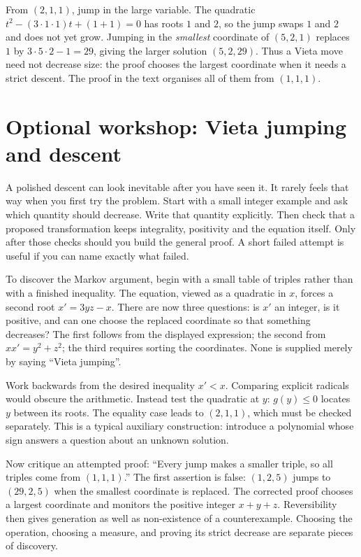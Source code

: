 \begin{examplex}
From $(2,1,1)$, jump in the large variable. The quadratic $t^2-(3\cdot 1\cdot 1)t+(1+1)=0$ has roots $1$ and $2$, so the jump swaps $1$ and $2$ and does not yet grow. Jumping in the \emph{smallest} coordinate of $(5,2,1)$ replaces $1$ by $3\cdot5\cdot2-1=29$, giving the larger solution $(5,2,29)$. Thus a Vieta move need not decrease size: the proof chooses the largest coordinate when it needs a strict descent. The proof in the text organises all of them from $(1,1,1)$.
\end{examplex}

\section{Optional workshop: Vieta jumping and descent}

A polished descent can look inevitable after you have seen it. It rarely feels that way when you first try the problem. Start with a small integer example and ask which quantity should decrease. Write that quantity explicitly. Then check that a proposed transformation keeps integrality, positivity and the equation itself. Only after those checks should you build the general proof. A short failed attempt is useful if you can name exactly what failed.

To discover the Markov argument, begin with a small table of triples rather
than with a finished inequality. The equation, viewed as a quadratic in $x$,
forces a second root $x'=3yz-x$. There are now three questions: is $x'$
an integer, is it positive, and can one choose the replaced coordinate so
that something decreases? The first follows from the displayed expression;
the second from $xx'=y^2+z^2$; the third requires sorting the coordinates.
None is supplied merely by saying ``Vieta jumping''.

Work backwards from the desired inequality $x'<x$. Comparing explicit
radicals would obscure the arithmetic. Instead test the quadratic at $y$:
$g(y)\le0$ locates $y$ between its roots. The equality case leads to
$(2,1,1)$, which must be checked separately. This is a typical auxiliary
construction: introduce a polynomial whose sign answers a question about
an unknown solution.

Now critique an attempted proof: ``Every jump makes a smaller triple, so
all triples come from $(1,1,1)$.'' The first assertion is false:
$(1,2,5)$ jumps to $(29,2,5)$ when the smallest coordinate is replaced.
The corrected proof chooses a largest coordinate and monitors the positive
integer $x+y+z$. Reversibility then gives generation as well as non-existence
of a counterexample. Choosing the operation, choosing a measure, and
proving its strict decrease are separate pieces of discovery.

